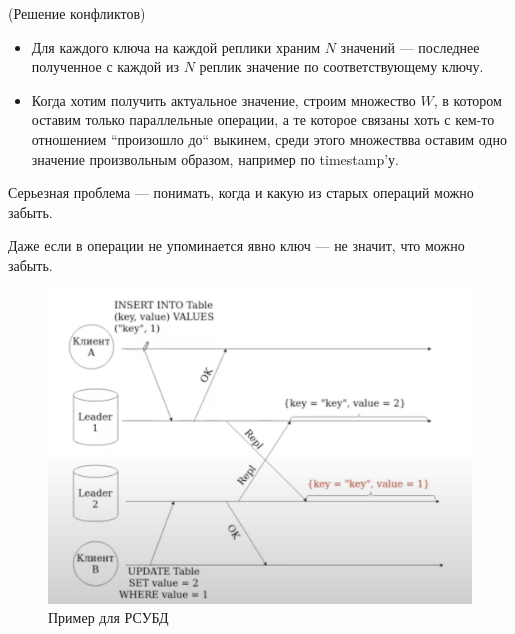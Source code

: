         \begin{algorithm}(Решение конфликтов)
          \begin{itemize}
            \item Для каждого ключа на каждой реплики храним $N$ значений --- последнее полученное с каждой из $N$ реплик значение по соответствующему ключу.
            \item Когда хотим получить актуальное значение, строим множество $W$, в котором оставим только параллельные операции, а те которое связаны хоть с кем-то отношением ``произошло до`` выкинем, среди этого множествва оставим одно значение произвольным образом, например по timestamp'у.
          \end{itemize}
        \end{algorithm}
    \begin{remark}
      Серьезная проблема --- понимать, когда и какую из старых операций можно забыть.
    \end{remark}
    \begin{example}
      Даже если в операции не упоминается явно ключ --- не значит, что можно забыть.\\
        \begin{figure}[h]
            \centering
            \includegraphics[scale = 0.5]{../assets/14.png}
            \caption{Пример для РСУБД}
        \end{figure}
    \end{example}
